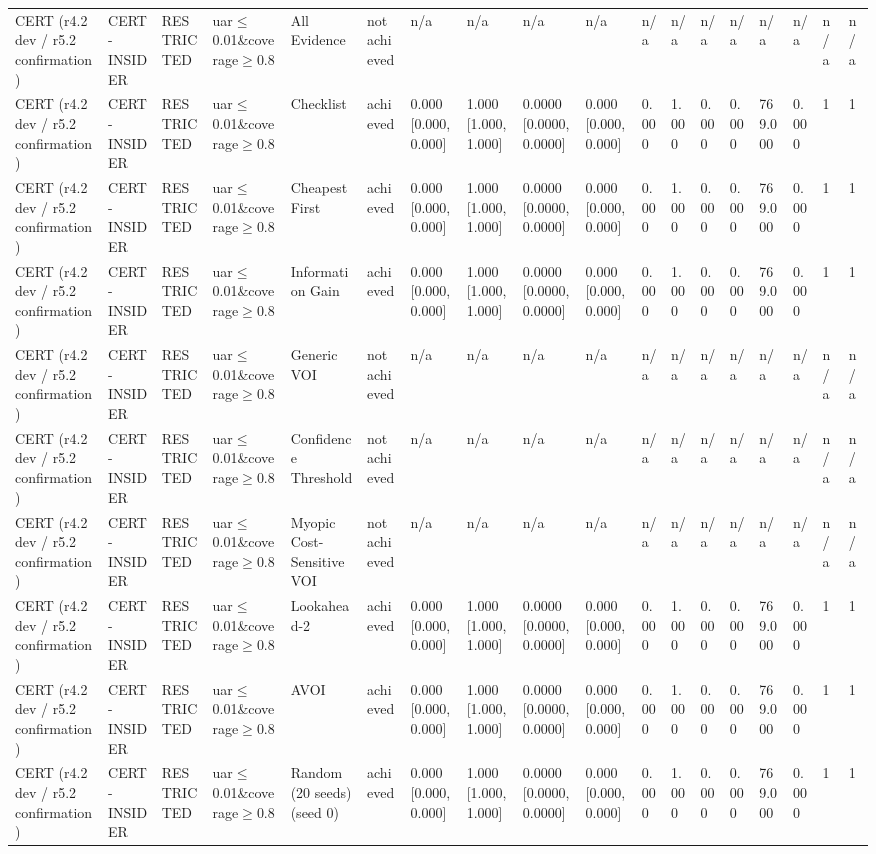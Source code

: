 \begin{table}[!ht]
{\begin{tabular}{llllllllllllllllll}
CERT (r4.2 dev / r5.2 confirmation) & CERT-INSIDER & RESTRICTED & uar$\le$0.01\&coverage$\ge$0.8 & All Evidence & not achieved & n/a & n/a & n/a & n/a & n/a & n/a & n/a & n/a & n/a & n/a & n/a & n/a \\
CERT (r4.2 dev / r5.2 confirmation) & CERT-INSIDER & RESTRICTED & uar$\le$0.01\&coverage$\ge$0.8 & Checklist & achieved & 0.000 [0.000, 0.000] & 1.000 [1.000, 1.000] & 0.0000 [0.0000, 0.0000] & 0.000 [0.000, 0.000] & 0.000 & 1.000 & 0.000 & 0.000 & 769.000 & 0.000 & 1 & 1 \\
CERT (r4.2 dev / r5.2 confirmation) & CERT-INSIDER & RESTRICTED & uar$\le$0.01\&coverage$\ge$0.8 & Cheapest First & achieved & 0.000 [0.000, 0.000] & 1.000 [1.000, 1.000] & 0.0000 [0.0000, 0.0000] & 0.000 [0.000, 0.000] & 0.000 & 1.000 & 0.000 & 0.000 & 769.000 & 0.000 & 1 & 1 \\
CERT (r4.2 dev / r5.2 confirmation) & CERT-INSIDER & RESTRICTED & uar$\le$0.01\&coverage$\ge$0.8 & Information Gain & achieved & 0.000 [0.000, 0.000] & 1.000 [1.000, 1.000] & 0.0000 [0.0000, 0.0000] & 0.000 [0.000, 0.000] & 0.000 & 1.000 & 0.000 & 0.000 & 769.000 & 0.000 & 1 & 1 \\
CERT (r4.2 dev / r5.2 confirmation) & CERT-INSIDER & RESTRICTED & uar$\le$0.01\&coverage$\ge$0.8 & Generic VOI & not achieved & n/a & n/a & n/a & n/a & n/a & n/a & n/a & n/a & n/a & n/a & n/a & n/a \\
CERT (r4.2 dev / r5.2 confirmation) & CERT-INSIDER & RESTRICTED & uar$\le$0.01\&coverage$\ge$0.8 & Confidence Threshold & not achieved & n/a & n/a & n/a & n/a & n/a & n/a & n/a & n/a & n/a & n/a & n/a & n/a \\
CERT (r4.2 dev / r5.2 confirmation) & CERT-INSIDER & RESTRICTED & uar$\le$0.01\&coverage$\ge$0.8 & Myopic Cost-Sensitive VOI & not achieved & n/a & n/a & n/a & n/a & n/a & n/a & n/a & n/a & n/a & n/a & n/a & n/a \\
CERT (r4.2 dev / r5.2 confirmation) & CERT-INSIDER & RESTRICTED & uar$\le$0.01\&coverage$\ge$0.8 & Lookahead-2 & achieved & 0.000 [0.000, 0.000] & 1.000 [1.000, 1.000] & 0.0000 [0.0000, 0.0000] & 0.000 [0.000, 0.000] & 0.000 & 1.000 & 0.000 & 0.000 & 769.000 & 0.000 & 1 & 1 \\
CERT (r4.2 dev / r5.2 confirmation) & CERT-INSIDER & RESTRICTED & uar$\le$0.01\&coverage$\ge$0.8 & AVOI & achieved & 0.000 [0.000, 0.000] & 1.000 [1.000, 1.000] & 0.0000 [0.0000, 0.0000] & 0.000 [0.000, 0.000] & 0.000 & 1.000 & 0.000 & 0.000 & 769.000 & 0.000 & 1 & 1 \\
CERT (r4.2 dev / r5.2 confirmation) & CERT-INSIDER & RESTRICTED & uar$\le$0.01\&coverage$\ge$0.8 & Random (20 seeds) (seed 0) & achieved & 0.000 [0.000, 0.000] & 1.000 [1.000, 1.000] & 0.0000 [0.0000, 0.0000] & 0.000 [0.000, 0.000] & 0.000 & 1.000 & 0.000 & 0.000 & 769.000 & 0.000 & 1 & 1 \\

\end{tabular}}
\end{table}
